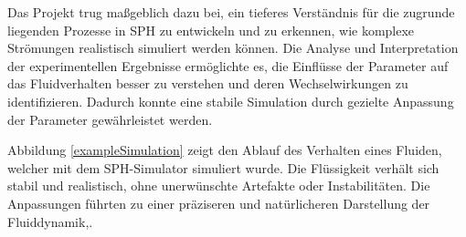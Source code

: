 \documentclass[a4paper, 12pt]{article}
\begin{document}
Das Projekt trug maßgeblich dazu bei, ein tieferes Verständnis für die zugrunde liegenden Prozesse in SPH zu entwickeln und zu erkennen, wie komplexe Strömungen realistisch simuliert werden können. Die Analyse und Interpretation der experimentellen Ergebnisse ermöglichte es, die Einflüsse der Parameter auf das Fluidverhalten besser zu verstehen und deren Wechselwirkungen zu identifizieren. Dadurch konnte eine stabile Simulation durch gezielte Anpassung der Parameter gewährleistet werden.

Abbildung \ref{exampleSimulation} zeigt den Ablauf des Verhalten eines Fluiden, welcher mit dem SPH-Simulator simuliert wurde. Die Flüssigkeit verhält sich stabil und realistisch, ohne unerwünschte Artefakte oder Instabilitäten. Die Anpassungen führten zu einer präziseren und natürlicheren Darstellung der Fluiddynamik,.
\end{document}
